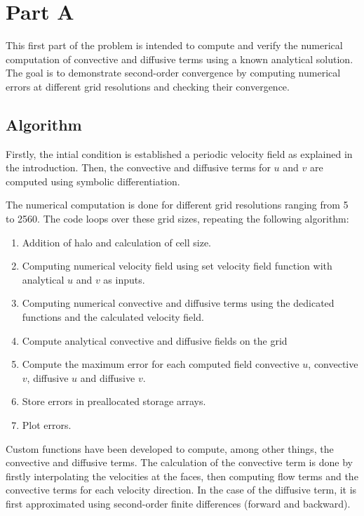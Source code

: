 \section{Part A}

This first part of the problem is intended to compute and verify the numerical computation of convective and diffusive terms using a known analytical solution. The goal is to demonstrate second-order convergence by computing numerical errors at different grid resolutions and checking their convergence.

\subsection{Algorithm}

Firstly, the intial condition is established a periodic velocity field as explained in the introduction. Then, the convective and diffusive terms for $u$ and $v$ are computed using symbolic differentiation.

The numerical computation is done for different grid resolutions ranging from 5 to 2560. The code loops over these grid sizes, repeating the following algorithm:

\begin{enumerate}
    \item Addition of halo and calculation of cell size.
    \item Computing numerical velocity field using set velocity field function with analytical $u$ and $v$ as inputs.
    \item Computing numerical convective and diffusive terms using the dedicated functions and the calculated velocity field.
    \item Compute analytical convective and diffusive fields on the grid
    \item Compute the maximum error for each computed field convective $u$, convective $v$, diffusive $u$ and diffusive $v$.
    \item Store errors in preallocated storage arrays.
    \item Plot errors.
\end{enumerate}

Custom functions have been developed to compute, among other things, the convective and diffusive terms. The calculation of the convective term is done by firstly interpolating the velocities at the faces, then computing flow terms and the convective terms for each velocity direction. In the case of the diffusive term, it is first approximated using second-order finite differences (forward and backward).

